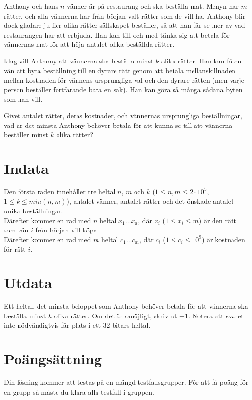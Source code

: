 Anthony och hans $n$ vänner är på restaurang och ska beställa mat. Menyn har $m$ rätter, och alla vännerna har från början valt rätter som de vill ha. Anthony blir dock gladare ju fler olika rätter sällskapet beställer, så att han får se mer av vad restaurangen har att erbjuda. Han kan till och med tänka sig att betala för vännernas mat för att höja antalet olika beställda rätter.

Idag vill Anthony att vännerna ska beställa minst $k$ olika rätter. Han kan få en vän att byta beställning till en dyrare rätt genom att betala mellanskillnaden mellan kostnaden för vännens ursprungliga val och den dyrare rätten (men varje person beställer fortfarande bara en sak). Han kan göra så många sådana byten som han vill.

Givet antalet rätter, deras kostnader, och vännernas ursprungliga beställningar, vad är det minsta Anthony behöver betala för att kunna se till att vännerna beställer minst $k$ olika rätter?

\section*{Indata}
Den första raden innehåller tre heltal $n$, $m$ och $k$ ($1 \leq n, m \leq 2 \cdot 10^5$, $1 \le k \le min(n, m)$), antalet vänner, antalet rätter och det önskade antalet unika beställningar. \\
Därefter kommer en rad med $n$ heltal $x_1 \dots x_n$, där $x_i$ ($1 \leq x_i \leq m$) är den rätt som vän $i$ från början vill köpa. \\
Därefter kommer en rad med $m$ heltal $c_1 \dots c_m$, där $c_i$ ($1 \leq c_i \leq 10^9$) är kostnaden för rätt $i$.

\section*{Utdata}
Ett heltal, det minsta beloppet som Anthony behöver betala för att vännerna ska beställa minst $k$ olika rätter. Om det är omöjligt, skriv ut $-1$. Notera att svaret inte nödvändigtvis får plats i ett $32$-bitars heltal.

\section*{Poängsättning}
Din lösning kommer att testas på en mängd testfallsgrupper.
För att få poäng för en grupp så måste du klara alla testfall i gruppen.

